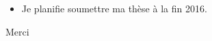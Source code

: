 \documentclass{beamer}
\begin{document}
{\begin{itemize}
\begin{itemize}
\end{itemize}

\item Je planifie soumettre ma thèse à la fin 2016.

\end{itemize}
}







\begin{frame}
\Huge{\centerline{Merci}}
\end{frame}

\end{document}
